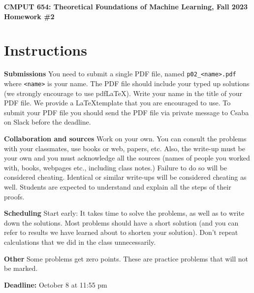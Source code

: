 \documentclass{article}
\newcommand{\hwnumber}{2}
\DeclareMathOperator*{\1}{\mathbbm{1}}
\theoremstyle{definition}
\theoremstyle{remark}
\begin{document}
\begin{center}
{\Large \textbf{CMPUT 654: Theoretical Foundations of Machine Learning, Fall 2023\\ Homework \#\hwnumber}}
\end{center}

\section*{Instructions}
\textbf{Submissions}
You need to submit a single PDF file, named {\tt p0\hwnumber\_<name>.pdf} where {\tt <name>} is your name.
The PDF file should include your typed up solutions (we strongly encourage to use pdf\LaTeX). 
Write your name in the title of your PDF file.
We provide a \LaTeX template that you are encouraged to use.
To submit your PDF file you should send the PDF file via private message to Csaba on Slack before the deadline.


\textbf{Collaboration and sources}
Work on your own. You can consult the problems with your classmates, use books
or web, papers, etc.
Also, the write-up must be your own and you must acknowledge all the
sources (names of people you worked with, books, webpages etc., including class notes.) 
Failure to do so will be considered cheating.  
Identical or similar write-ups will be considered cheating as well.
Students are expected to understand and explain all the steps of their proofs.

\textbf{Scheduling}
Start early: It takes time to solve the problems, as well as to write down the solutions. Most problems should have a short solution (and you can refer to results we have learned about to shorten your solution). Don't repeat calculations that we did in the class unnecessarily.

\textbf{Other}
Some problems get zero points. These are practice problems that will not be marked.

\vspace{0.3cm}

\textbf{Deadline:} October 8 at 11:55 pm

\newcommand{\cM}{\mathcal{M}}
\newcommand{\nS}{\mathrm{S}}
\newcommand{\nA}{\mathrm{A}}
\newcommand{\PP}{\mathbb{P}}
\newcommand{\RR}{\mathbb{R}}
\newcommand{\cX}{\mathcal{X}}
\newcommand{\cE}{\mathcal{E}}
\newcommand{\cY}{\mathcal{Y}}
\newcommand{\cZ}{\mathcal{Z}}
\newcommand{\cG}{\mathcal{G}}
\newcommand{\cD}{\mathcal{D}}
\newcommand{\cN}{\mathcal{N}}
\newcommand{\ip}[1]{\langle #1 \rangle}
\newcommand{\one}[1]{\mathbb{I}\{#1\}}
\newcommand{\KL}{\mathrm{KL}}
\end{document}
